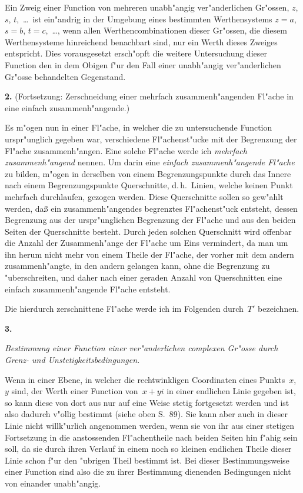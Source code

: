 \documentclass[12pt,a4paper]{book}
\theoremstyle{definition}
\theoremstyle{remark}
\begin{document}
Ein Zweig einer Function von mehreren unabh"angig ver"anderlichen
Gr"ossen, $z$, $s$, $t$,\ \ldots\ ist ein"andrig in der Umgebung eines bestimmten
Werthensystems $z = a$, $s = b$, $t = c$,\ \ldots, wenn allen Werthencombinationen dieser Gr"ossen, die diesem Werthensysteme hinreichend benachbart
sind, nur ein Werth dieses Zweiges entspricht. Dies vorausgesetzt
ersch"opft die weitere Untersuchung dieser Function den in dem Obigen
f"ur den Fall einer unabh"angig ver"anderlichen Gr"osse behandelten
Gegenstand.

\medskip
\textbf{2.} (Fortsetzung: Zerschneidung einer mehrfach zusammenh"angenden
Fl"ache in eine einfach zusammenh"angende.)

Es m"ogen nun in einer Fl"ache, in welcher die zu untersuchende
Function urspr"unglich gegeben war, verschiedene Fl"achenst"ucke mit der
Begrenzung der Fl"ache zusammenh"angen. Eine solche Fl"ache werde
ich \emph{mehrfach zusammenh"angend} nennen. Um darin eine
\emph{einfach zusammenh"angende Fl"ache} zu bilden, m"ogen in derselben
von einem Begrenzungspunkte durch das Innere nach einem Begrenzungspunkte
Querschnitte, d.\,h.\ Linien, welche keinen Punkt mehrfach durchlaufen,
gezogen werden. Diese Querschnitte sollen so gew"ahlt werden, da\ss{}
ein zusammenh"angendes begrenztes Fl"achenst"uck entsteht, dessen
Begrenzung aus der urspr"unglichen Begrenzung der Fl"ache und aus
den beiden Seiten der Querschnitte besteht. Durch jeden solchen
Querschnitt wird offenbar die Anzahl der Zusammenh"ange der Fl"ache
um Eins vermindert, da man um ihn herum nicht mehr von einem
Theile der Fl"ache, der vorher mit dem andern zusammenh"angte, in
den andern gelangen kann, ohne die Begrenzung zu "uberschreiten, und
daher nach einer geraden Anzahl von Querschnitten eine einfach
zusammenh"angende Fl"ache entsteht.

Die hierdurch zerschnittene Fl"ache werde ich im Folgenden durch~$T'$
bezeichnen.

\medskip
\textbf{3.}

\textit{Bestimmung einer Function einer ver"anderlichen complexen Gr"osse
durch Grenz- und Unstetigkeitsbedingungen.}

Wenn in einer Ebene, in welcher die rechtwinkligen Coordinaten eines
Punkts~$x$,~$y$ sind, der Werth einer Function von~$x + yi$ in einer
endlichen Linie gegeben ist, so kann diese von dort aus nur auf eine
Weise stetig fortgesetzt werden und ist also dadurch v"ollig bestimmt
(siehe oben S.~89). Sie kann aber auch in dieser Linie nicht willk"urlich
angenommen werden, wenn sie von ihr aus einer stetigen Fortsetzung in
die anstossenden Fl"achentheile nach beiden Seiten hin f"ahig sein soll,
da sie durch ihren Verlauf in einem noch so kleinen endlichen Theile
dieser Linie schon f"ur den "ubrigen Theil bestimmt ist. Bei dieser
Bestimmungsweise einer Function sind also die zu ihrer Bestimmung
dienenden Bedingungen nicht von einander unabh"angig.
\end{document}
